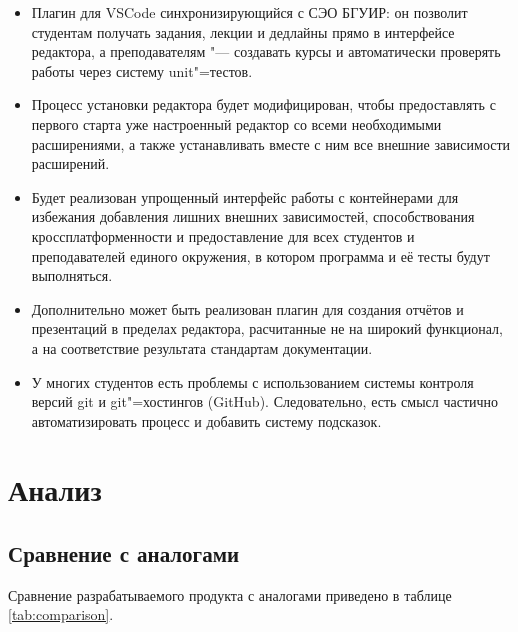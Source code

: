\documentclass{bsuir}
\begin{document}
\begin{itemize}
      \item
            Плагин для VSCode синхронизирующийся с СЭО БГУИР: он позволит
            студентам получать задания, лекции и дедлайны прямо в интерфейсе
            редактора, а преподавателям "--- создавать курсы и автоматически
            проверять работы через систему unit"=тестов.
      \item
            Процесс установки редактора будет модифицирован, чтобы предоставлять
            с первого старта уже настроенный редактор со всеми необходимыми
            расширениями, а также устанавливать вместе с ним все внешние
            зависимости расширений.
      \item
            Будет реализован упрощенный интерфейс работы с контейнерами для
            избежания добавления лишних внешних зависимостей, способствования
            кроссплатформенности и предоставление для всех студентов и
            преподавателей единого окружения, в котором программа и её тесты
            будут выполняться.
      \item
            Дополнительно может быть реализован плагин для создания отчётов и
            презентаций в пределах редактора, расчитанные не на широкий
            функционал, а на соответствие результата стандартам документации.
      \item
            У многих студентов есть проблемы с использованием системы контроля
            версий git и git"=хостингов (GitHub). Следовательно, есть смысл
            частично автоматизировать процесс и добавить систему подсказок.
\end{itemize}

\section{Анализ}

\subsection{Сравнение с аналогами}

Сравнение разрабатываемого продукта с аналогами приведено в таблице
\ref{tab:comparison}.
\end{document}
